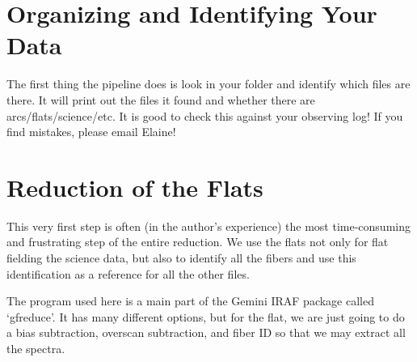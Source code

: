 \documentclass[12pt]{report}
\begin{document}
\section{Organizing and Identifying Your Data}

\noindent The first thing the pipeline does is look in your folder and identify which files are there. It will print out the files it found and whether there are arcs/flats/science/etc. It is good to check this against your observing log! If you find mistakes, please email Elaine!

\section{Reduction of the Flats}

This very first step is often (in the author's experience) the most time-consuming and frustrating step of the entire reduction. We use the flats not only for flat fielding the science data, but also to identify all the fibers and use this identification as a reference for all the other files.

The program used here is a main part of the Gemini IRAF package called `gfreduce'. It has many different options, but for the flat, we are just going to do a bias subtraction, overscan subtraction, and fiber ID so that we may extract all the spectra.
\end{document}
